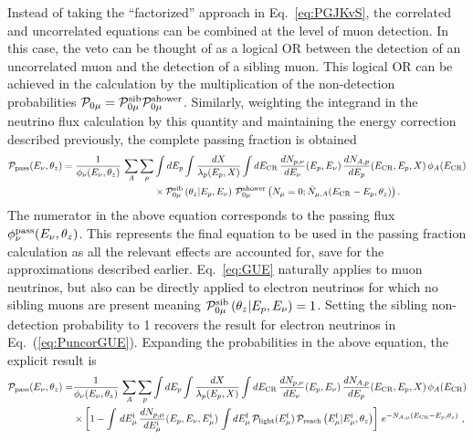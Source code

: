 Instead of taking the ``factorized'' approach in Eq.~\ref{eq:PGJKvS}, the correlated and uncorrelated equations can be combined at the level of muon detection.
In this case, the veto can be thought of as a logical OR between the detection of an uncorrelated muon and the detection of a sibling muon.
This logical OR can be achieved in the calculation by the multiplication of the non-detection probabilities ${\mathcal P}_{0\mu} = {\mathcal P}_{0\mu}^{\rm sib} {\mathcal P}_{0\mu}^{\rm shower}$.
Similarly, weighting the integrand in the neutrino flux calculation by this quantity and maintaining the energy correction described previously, the complete passing fraction is obtained
\begin{align}
\label{eq:GUE}
{\mathcal P}_{\rm pass}(E_\nu, \theta_z) = \frac{1}{\phi_\nu(E_\nu, \theta_z)} \, \sum_A \sum_{p} & \int dE_p  \int \frac{dX}{\lambda_p(E_p, X)} \int dE_{\rm CR} \, \frac{dN_{p, \nu}}{dE_\nu}(E_p, E_\nu) \, \frac{dN_{A, p}}{dE_p}(E_{\rm CR}, E_p, X) \, \phi_A(E_{\rm CR}) \nonumber \\
& \times {\mathcal P}_{0\mu}^{\rm sib} \left(\theta_z|E_p, E_\nu \right) \, {\mathcal P}_{0\mu}^{\rm shower}\left(N_\mu=0;  \bar N_{\mu, A}(E_{\rm CR} - E_p, \theta_z) \right).
\end{align}
The numerator in the above equation corresponds to the passing flux $\phi_\nu^{\rm pass}(E_\nu, \theta_z)$.
This represents the final equation to be used in the passing fraction calculation as all the relevant effects are accounted for, save for the approximations described earlier.
Eq.~\ref{eq:GUE} naturally applies to muon neutrinos, but also can be directly applied to electron neutrinos for which no sibling muons are present meaning ${\mathcal P}_{0\mu}^{\rm sib} \left(\theta_z | E_p, E_\nu \right) = 1$.
Setting the sibling non-detection probability to 1 recovers the result for electron neutrinos in Eq.~(\ref{eq:PuncorGUE}).
Expanding the probabilities in the above equation, the explicit result is
\begin{align}
\label{eq:GUEexplicit}
{\mathcal P}_{\rm pass} (E_\nu, \theta_z) = & \frac{1}{\phi_\nu(E_\nu, \theta_z)} \, \sum_A \sum_{p} \int dE_p \int \frac{dX}{\lambda_p(E_p, X)} \int dE_{\rm CR} \, \frac{dN_{p, \nu}}{dE_\nu}(E_p, E_\nu) \, \frac{dN_{A, p}}{dE_p}(E_{\rm CR}, E_p, X) \, \phi_A(E_{\rm CR}) \nonumber \\
& \times \left[ 1 - \int \, dE_{\mu}^{\rm i} \, \frac{dN_{p, \mu}}{dE_{\mu}^{\rm i}}(E_p, E_\nu, E_{\mu}^{\rm i}) \, \int dE_{\mu}^{\rm f} \, {\mathcal P}_{\rm light}(E_{\mu}^{\rm f})  \, {\mathcal P}_{\rm reach}\left(E_{\mu}^{\rm f} | E_{\mu}^{\rm i}, \theta_z\right) \right] \, e^{-N_{A, \mu}(E_{\rm CR} - E_p, \theta_z)}  ~,
\end{align}

